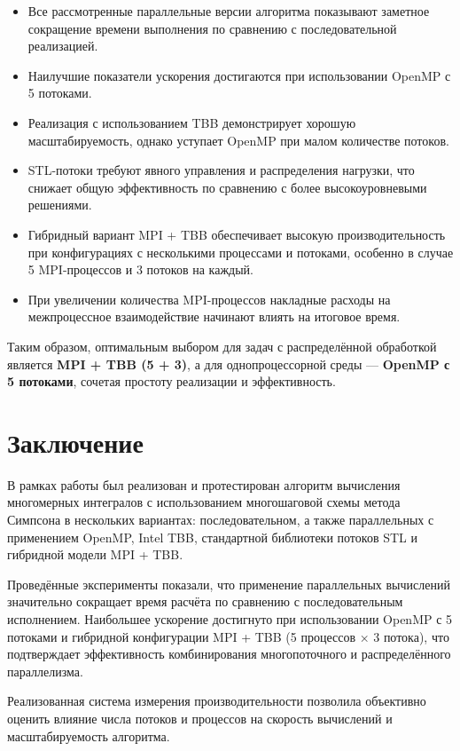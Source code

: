 \documentclass[14pt,a4paper]{extarticle}
\begin{document}
\begin{itemize}
    \item Все рассмотренные параллельные версии алгоритма показывают заметное сокращение времени выполнения по сравнению с последовательной реализацией.
    \item Наилучшие показатели ускорения достигаются при использовании OpenMP с 5 потоками.
    \item Реализация с использованием TBB демонстрирует хорошую масштабируемость, однако уступает OpenMP при малом количестве потоков.
    \item STL-потоки требуют явного управления и распределения нагрузки, что снижает общую эффективность по сравнению с более высокоуровневыми решениями.
    \item Гибридный вариант MPI + TBB обеспечивает высокую производительность при конфигурациях с несколькими процессами и потоками, особенно в случае 5 MPI-процессов и 3 потоков на каждый.
    \item При увеличении количества MPI-процессов накладные расходы на межпроцессное взаимодействие начинают влиять на итоговое время.
\end{itemize}

Таким образом, оптимальным выбором для задач с распределённой обработкой является \textbf{MPI + TBB (5 + 3)}, 
а для однопроцессорной среды — \textbf{OpenMP с 5 потоками}, сочетая простоту реализации и эффективность.

\section{Заключение}

В рамках работы был реализован и протестирован алгоритм вычисления многомерных интегралов с использованием многошаговой схемы метода Симпсона в нескольких вариантах: последовательном, а также параллельных с применением OpenMP, Intel TBB, стандартной библиотеки потоков STL и гибридной модели MPI + TBB.

Проведённые эксперименты показали, что применение параллельных вычислений значительно сокращает время расчёта по сравнению с последовательным исполнением. Наибольшее ускорение достигнуто при использовании OpenMP с 5 потоками и гибридной конфигурации MPI + TBB (5 процессов × 3 потока), что подтверждает эффективность комбинирования многопоточного и распределённого параллелизма.

Реализованная система измерения производительности позволила объективно оценить влияние числа потоков и процессов на скорость вычислений и масштабируемость алгоритма.
\end{document}
